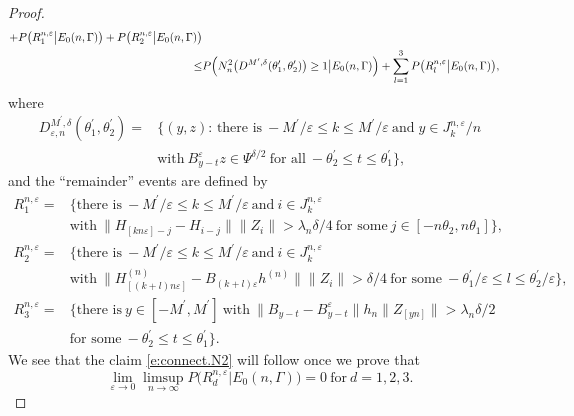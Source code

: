 \documentclass[11pt,reqno]{amsart}
\numberwithin{equation}{section}
\theoremstyle{definition}
\theoremstyle{remark}
\theoremstyle{definition}
\newcommand{\eps}{\varepsilon}
\begin{document}
\begin{proof}
\begin{align*}
 + P\bigl( R_1^{n,
                    \eps}\big|E_0(n,\Gamma)\bigr)+P\bigl( R_2^{n,
       \eps}\big|E_0(n,\Gamma)\bigr) \\
  \leq &P\Bigl( N_n^2\bigl(D^{M^{\prime},\delta}(\theta_1^\prime,\theta_2^\prime)\bigr)\geq 1\big| E_0(n,\Gamma)\Bigr)
 + \sum_{l=1}^3 P\bigl( R_l^{n,
                    \eps}\big|E_0(n,\Gamma)\bigr), 
\end{align*}
where 
\begin{align*}
D_{\eps,n}^{M^\prime,\delta}(\theta_1^\prime,\theta_2^\prime) = &\bigl\{ (y,z):\,\text{there is} \ -M^\prime/\eps \leq k\leq
                   M^\prime/\eps \ \text{and} \; y\in J_k^{n,   \eps} /n \\
                   \
 & \text{with} \ B_{y-t}^\eps z\in \Psi^{\delta/2} \ \text{for all} \
  -\theta_2^\prime\leq t\leq \theta_1^\prime\bigr\}, 
\end{align*}
and the ``remainder'' events are defined by 
\begin{align*}
  R_1^{n, \eps}=& \bigl\{ \text{there is} \ -M^\prime/\eps \leq k\leq
                   M^\prime/\eps \ \text{and} \ i\in J_k^{n,
   \eps}  \\
   &\text{with} \ \| H_{[kn\eps]-j}-H_{i-j}\|\| Z_i\|
                          >\lambda_n\delta/4 \ \text{for some} \ j\in
                           [-n\theta_2,n\theta_1]\bigr\}, \\
 R_2^{n, \eps}=& \bigl\{ \text{there is} \   -M^\prime/\eps \leq k\leq
                   M^\prime/\eps \ \text{and} \ i\in J_k^{n,
   \eps} \\
&\text{with}  \ \|H^{(n)}_{[(k+l)n\eps]} -B_{(k+l)\eps}
                  h^{(n)}\|\|Z_i\|>\delta/4 \ 
                     \text{for some} \ -\theta_1^\prime/\eps\leq
                    l\leq\theta_2^\prime/\eps \bigr\}, \\
R_3^{n, \eps}=& \bigl\{ \text{there is} \ y\in [-M^{\prime},M^{\prime}] \
  \text{with} \ \| B_{y-t}-B_{y-t}^\eps\|h_n \|
                Z_{[yn]}\|>\lambda_n\delta/2 \\
   &\text{for some} \
                -\theta_2^\prime\leq t\leq \theta_1^\prime \bigr\}. 
   \end{align*}
We see that the claim \eqref{e:connect.N2} will follow once we prove
that 
   \begin{equation} \label{e:remainders.small}
 \lim_{\eps\to 0} \limsup_{n\to\infty} P\bigl( R_d^{n,
                    \eps}\big|E_0(n,\Gamma)\bigr) =0 \ \text{for} \ d=1,2,3.
                \end{equation}


\end{proof}
\end{document}
